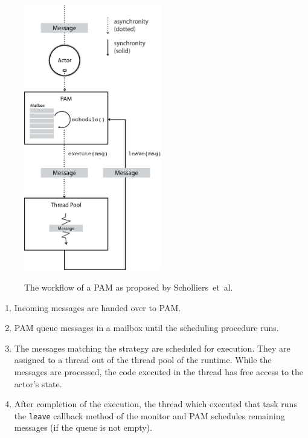 \documentclass[11pt, journal]{IEEEtran}
\newcommand{\ct}{\lstinline[backgroundcolor=\color{white},basicstyle=\footnotesize\ttfamily]}
\begin{document}
\begin{figure}[!htbp]
\centering
\includegraphics[width=6cm]{figures/pam_workflow-02.eps}
	\begin{caption}
		{The workflow of a PAM as proposed by Scholliers~et~al.~\cite{Scholliers2010a}} \label{fig:pamworkflow}
	\end{caption}
\end{figure}

\begin{enumerate}[\IEEEsetlabelwidth{6}]
	\item Incoming messages are handed over to PAM.
	\item PAM queue messages in a mailbox until the scheduling procedure runs.
	\item The messages matching the strategy are scheduled for execution. They are assigned to a thread out of the thread pool of the runtime. While the messages are processed, the code executed in the thread has free access to the actor's state.
	\item After completion of the execution, the thread which executed that task runs the \ct{leave} callback method of the monitor and PAM schedules remaining messages (if the queue is not empty).\\
\end{enumerate}
\end{document}
